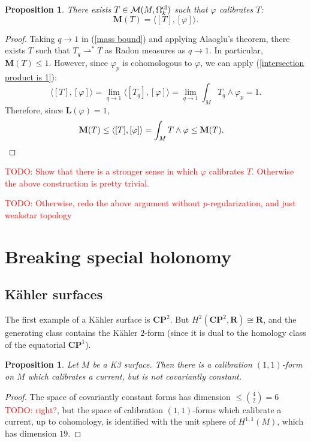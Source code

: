 \documentclass[reqno,11pt]{amsart}
\newcommand{\RR}{\mathbf{R}}
\newcommand{\CC}{\mathbf{C}}
\newcommand{\PP}{\mathbf P}
\newcommand{\Mass}{\mathbf M}
\newcommand{\Comass}{\mathbf L}
\newcommand{\weakto}{\rightharpoonup}
\newtheorem{proposition}[theorem]{Proposition}
\theoremstyle{definition}
\numberwithin{equation}{section}
\newcommand\todo[1]{\textcolor{red}{TODO: #1}}
\begin{document}
\begin{proposition}
There exists $T \in \mathcal M(M, \Omega_k^{\rm cl})$ such that $\varphi$ calibrates $T$:
$$\Mass(T) = \langle [T], [\varphi]\rangle.$$
\end{proposition}
\begin{proof}
Taking $q \to 1$ in (\ref{mass bound}) and applying Alaoglu's theorem, there exists $T$ such that $T_q \weakto^* T$ as Radon measures as $q \to 1$.
In particular, $\Mass(T) \leq 1$.
However, since $\varphi_p$ is cohomologous to $\varphi$, we can apply (\ref{intersection product is 1}):
$$\langle [T], [\varphi]\rangle = \lim_{q \to 1} \langle [T_q], [\varphi]\rangle = \lim_{q \to 1} \int_M T_q \wedge \varphi_p = 1.$$
Therefore, since $\Comass(\varphi) = 1$,
\begin{align*}
\Mass(T) &\leq \langle [T], [\varphi]\rangle = \int_M T \wedge \varphi \leq \Mass(T). \qedhere 
\end{align*}
\end{proof}

\todo{Show that there is a stronger sense in which $\varphi$ calibrates $T$.
Otherwise the above construction is pretty trivial.}

\todo{Otherwise, redo the above argument without $p$-regularization, and just weakstar topology}

\section{Breaking special holonomy}
\subsection{K\"ahler surfaces}
The first example of a K\"ahler surface is $\CC \PP^2$.
But $H^2(\CC \PP^2, \RR) \cong \RR$, and the generating class contains the K\"ahler $2$-form (since it is dual to the homology class of the equatorial $\CC \PP^1$).

\begin{proposition}
Let $M$ be a K3 surface.
Then there is a calibration $(1, 1)$-form on $M$ which calibrates a current, but is not covariantly constant.
\end{proposition}
\begin{proof}
The space of covariantly constant forms has dimension $\leq \binom 42 = 6$ \todo{right?}, but the space of calibration $(1, 1)$-forms which calibrate a current, up to cohomology, is identified with the unit sphere of $H^{1, 1}(M)$, which has dimension $19$.
\end{proof}
\end{document}
